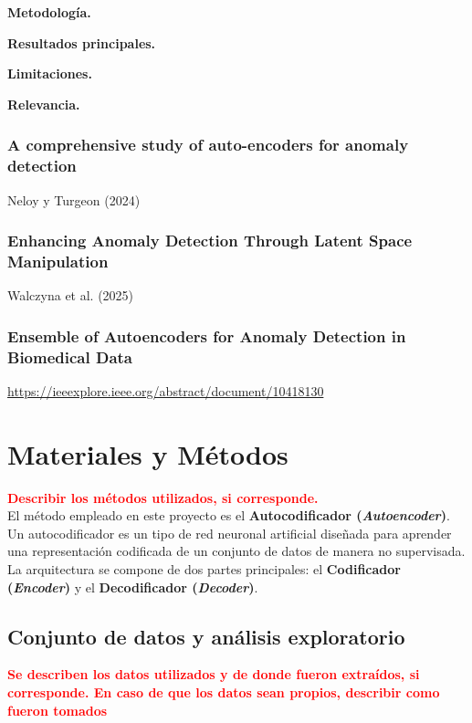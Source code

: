 \documentclass[a4paper,10pt]{book}
\newcommand{\comentario}[1]{\textbf{\textcolor{red}{#1}}}
\begin{document}
\textbf{Metodología.}  

\textbf{Resultados principales.}  

\textbf{Limitaciones.}  

\textbf{Relevancia.}  

\subsection{A comprehensive study of auto-encoders for anomaly detection}

Neloy y Turgeon (2024) \cite{neloy2024study}

\subsection{Enhancing Anomaly Detection Through Latent Space Manipulation}

Walczyna et al. (2025) \cite{walczyna2025latent}

\subsection{Ensemble of Autoencoders for Anomaly Detection in Biomedical Data}

\url{https://ieeexplore.ieee.org/abstract/document/10418130}

\chapter{Materiales y Métodos}

\comentario{Describir los métodos utilizados, si corresponde.}\\


El método empleado en este proyecto es el \textbf{Autocodificador (\textit{Autoencoder})}. Un autocodificador es un tipo de red neuronal artificial diseñada para aprender una representación codificada de un conjunto de datos de manera no supervisada. La arquitectura se compone de dos partes principales: el \textbf{Codificador (\textit{Encoder})} y el \textbf{Decodificador (\textit{Decoder})}.

\section{Conjunto de datos y análisis exploratorio}

\comentario{Se describen los datos utilizados y de donde fueron extraídos, si corresponde. En caso de que los datos sean propios, describir como fueron tomados}\\
\end{document}
